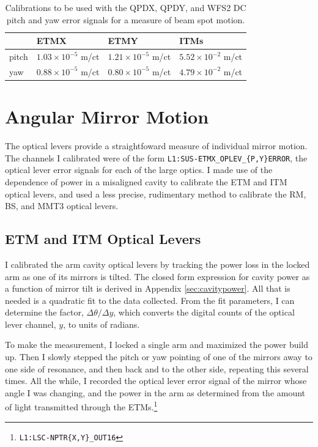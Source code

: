 \begin{table}
\centering
\caption[Beam spot motion calibrations]{Calibrations to be used with
 the QPDX, QPDY, and WFS2 DC pitch and yaw error signals for a
 measure of beam spot motion.} 
\begin{tabular}{l l l l}
\hline
         & ETMX & ETMY & ITMs \\
\hline
pitch & $1.03\times10^{-5}$ m/ct & $1.21\times10^{-5}$ m/ct & $5.52\times10^{-2}$ m/ct \\
yaw & $0.88\times10^{-5}$ m/ct & $0.80\times10^{-5}$ m/ct & $4.79\times10^{-2}$ m/ct \\
\hline
\end{tabular}
\label{table:bsmcal}
\end{table}



\section{Angular Mirror Motion}
The optical levers provide a straightfoward measure of individual
mirror motion. The channels I calibrated were of the form
\texttt{L1:SUS-ETMX\_OPLEV\_\{P,Y\}ERROR}, the optical lever error
signals for each of the large optics. I made use of the dependence of
power in a misaligned cavity to calibrate the ETM and ITM optical
levers, and used a less precise, rudimentary method to calibrate the
RM, BS, and MMT3 optical levers.


\subsection{ETM and ITM Optical Levers} 
I calibrated the arm cavity optical levers by tracking the power loss
in the locked arm as one of its mirrors is tilted. The closed form
expression for cavity power as a function of mirror tilt is derived in
Appendix \ref{sec:cavitypower}. All that is needed is a quadratic fit
to the data collected. From the fit parameters, I can determine the
factor, $\Delta \theta / \Delta y$, which converts the digital counts
of the optical lever channel, $y$, to units of radians.

To make the measurement, I locked a single arm and maximized the power
build up. Then I slowly stepped the pitch or yaw pointing of one of
the mirrors away to one side of resonance, and then back and to the
other side, repeating this several times. All the while, I recorded
the optical lever error signal of the mirror whose angle I was
changing, and the power in the arm as determined from the amount of
light transmitted through the
ETMs.\footnote{\texttt{L1:LSC-NPTR\{X,Y\}\_OUT16}}

